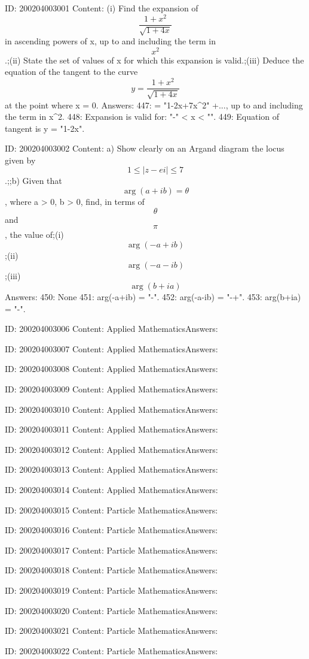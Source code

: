 \documentclass{article}
\begin{document}
ID: 200204003001
Content:
(i) Find the expansion of  $$\frac{1+x^2}{\sqrt{1 + 4x}}$$ in ascending powers of x, up to and including the term in  $$x^2 $$.;(ii) State the set of values of x for which this expansion is valid.;(iii) Deduce the equation of the tangent to the curve  $$y = \frac{1+x^2}{\sqrt{1 + 4x}}$$ at the point where x = 0.  Answers:
447:  = "1-2x+7x^2" +..., up to and including the term in x^2.
448: Expansion is valid for: "-" < x < "".
449: Equation of tangent is y = "1-2x".

ID: 200204003002
Content:
a)  Show clearly on an Argand diagram the locus given by  $$1 \le | z - ei | \le 7$$.;;b) Given that  $$\arg (a + ib ) = \theta $$, where a > 0, b > 0, find, in terms of  $$\theta $$ and  $$\pi $$, the value of;(i) $$\arg (-a + ib)$$;(ii) $$\arg (-a - ib)$$;(iii) $$\arg (b + ia)$$Answers:
450: None
451: arg(-a+ib) = "\pi-\theta".
452: arg(-a-ib) = "-\pi+\theta".
453: arg(b+ia) = "\pi-\theta".

ID: 200204003006
Content:
Applied MathematicsAnswers:

ID: 200204003007
Content:
Applied MathematicsAnswers:

ID: 200204003008
Content:
Applied MathematicsAnswers:

ID: 200204003009
Content:
Applied MathematicsAnswers:

ID: 200204003010
Content:
Applied MathematicsAnswers:

ID: 200204003011
Content:
Applied MathematicsAnswers:

ID: 200204003012
Content:
Applied MathematicsAnswers:

ID: 200204003013
Content:
Applied MathematicsAnswers:

ID: 200204003014
Content:
Applied MathematicsAnswers:

ID: 200204003015
Content:
Particle MathematicsAnswers:

ID: 200204003016
Content:
Particle MathematicsAnswers:

ID: 200204003017
Content:
Particle MathematicsAnswers:

ID: 200204003018
Content:
Particle MathematicsAnswers:

ID: 200204003019
Content:
Particle MathematicsAnswers:

ID: 200204003020
Content:
Particle MathematicsAnswers:

ID: 200204003021
Content:
Particle MathematicsAnswers:

ID: 200204003022
Content:
Particle MathematicsAnswers:
\end{document}
